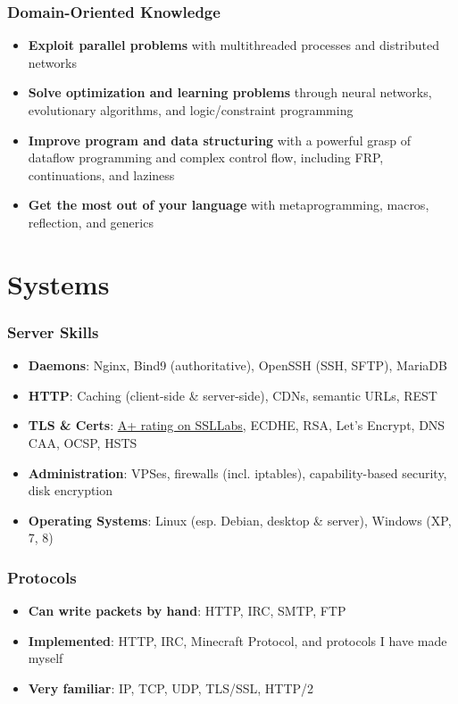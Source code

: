 \documentclass[11pt]{article}
\begin{document}
\subsubsection{Domain-Oriented Knowledge}
\begin{itemize}[noitemsep,nolistsep]
\item {\bf Exploit parallel problems} with multithreaded processes and distributed networks
\item {\bf Solve optimization and learning problems} through neural networks, evolutionary algorithms, and logic/constraint programming
\item {\bf Improve program and data structuring} with a powerful grasp of dataflow programming and complex control flow, including FRP, continuations, and laziness
\item {\bf Get the most out of your language} with metaprogramming, macros, reflection, and generics
\end{itemize}

\section{Systems}
\subsubsection{Server Skills}
\begin{itemize}[noitemsep,nolistsep]
\item {\bf Daemons}: Nginx, Bind9 (authoritative), OpenSSH (SSH, SFTP), MariaDB
\item {\bf HTTP}: Caching (client-side \& server-side), CDNs, semantic URLs, REST
\item {\bf TLS \& Certs}: \href{https://www.ssllabs.com/ssltest/analyze.html?d=lijero.co\&latest}{A+ rating on SSLLabs}, ECDHE, RSA, Let's Encrypt, DNS CAA, OCSP, HSTS
\item {\bf Administration}: VPSes, firewalls (incl. iptables), capability-based security, disk encryption
\item {\bf Operating Systems}: Linux (esp. Debian, desktop \& server), Windows (XP, 7, 8)
\end{itemize}

\subsubsection{Protocols}
\begin{itemize}[noitemsep,nolistsep]
\item {\bf Can write packets by hand}: HTTP, IRC, SMTP, FTP
\item {\bf Implemented}: HTTP, IRC, Minecraft Protocol, and protocols I have made myself
\item {\bf Very familiar}: IP, TCP, UDP, TLS/SSL, HTTP/2
\end{itemize}
\end{document}
